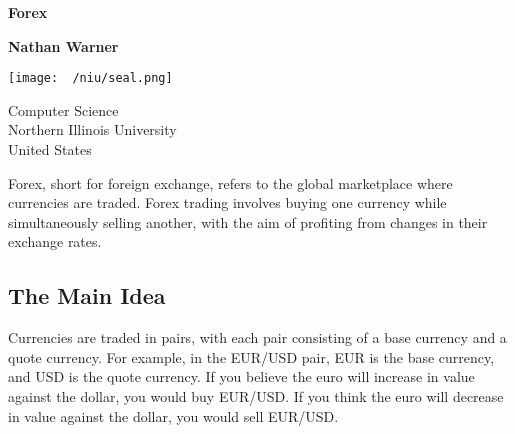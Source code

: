 \documentclass{report}
\title{\Huge{}}
\author{\huge{Nathan Warner}}
\date{\huge{}}
\begin{document}
        \begin{titlepage}
       \begin{center}
           \vspace*{1cm}
    
           \textbf{Forex}
    
           \vspace{0.5cm}
            
                
           \vspace{1.5cm}
    
           \textbf{Nathan Warner}
    
           \vfill
                
                
           \vspace{0.8cm}
         
           \texttt{[image: ~/niu/seal.png]}
                
           Computer Science \\
           Northern Illinois University\\
           United States\\
           
                
       \end{center}
    \end{titlepage}
    \tableofcontents
    \pagebreak 
    \bigbreak \noindent 
    Forex, short for foreign exchange, refers to the global marketplace where currencies are traded.
    \bigbreak \noindent 
    Forex trading involves buying one currency while simultaneously selling another, with the aim of profiting from changes in their exchange rates.
    \bigbreak \noindent 
    \subsection{The Main Idea}
    \bigbreak \noindent 
    Currencies are traded in pairs, with each pair consisting of a base currency and a quote currency. For example, in the EUR/USD pair, EUR is the base currency, and USD is the quote currency. If you believe the euro will increase in value against the dollar, you would buy EUR/USD. If you think the euro will decrease in value against the dollar, you would sell EUR/USD.

    \bigbreak \noindent 
\end{document}
